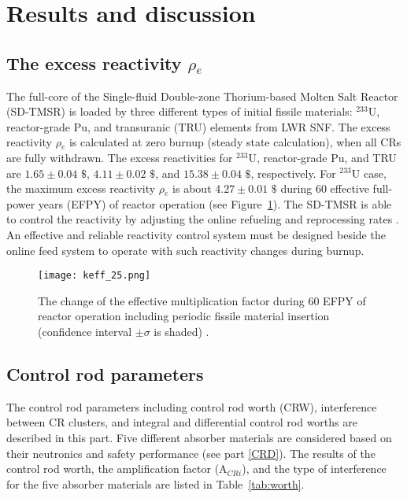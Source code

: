 \section{Results and discussion} \label{Results-and-discussion}

\subsection{The excess reactivity $\rho$$_e$}

The full-core of the Single-fluid Double-zone Thorium-based Molten Salt Reactor (SD-TMSR) is loaded by three different types of initial fissile materials: $^{233}$U, reactor-grade Pu, and transuranic (TRU) elements from \gls{LWR} \gls{SNF}.
The excess reactivity $\rho$$_e$ is calculated at zero burnup (steady state calculation), when all CRs are fully withdrawn. The excess reactivities for $^{233}$U, reactor-grade Pu, and TRU are $1.65\pm0.04$ $\$$, $4.11\pm0.02$ $\$$, and $15.38\pm0.04$ $\$$, respectively. For $^{233}$U case, the maximum excess reactivity $\rho$$_e$ is about $4.27\pm0.01$ $\$$ during 60 effective full-power years (EFPY) of reactor operation (see Figure~\ref{fig:keff_25}). The SD-TMSR is able to control the reactivity by adjusting the online refueling and reprocessing rates \cite{ashraf2019whole_core}. An effective and reliable reactivity control system must be designed beside the online feed system to operate with such reactivity changes during burnup.

\begin{figure}
	\centering
	\texttt{[image: keff\_25.png]}
	\vspace{-0.5in}
	\caption{The change of the effective multiplication factor during 60 EFPY of reactor operation including periodic fissile material insertion (confidence interval $\pm\sigma$ is shaded) \cite{ashraf2019whole_core}.} 
	\label{fig:keff_25}
\end{figure}

\subsection{Control rod parameters}

The control rod parameters including control rod worth (CRW), interference between CR clusters, and integral and differential control rod worths are described in this part. Five different absorber materials are considered based on their neutronics and safety performance (see part \ref{CRD}). The results of the control rod worth, the amplification factor (A$_{CRi}$), and the type of interference for the five absorber materials are listed in Table~\ref{tab:worth}.

